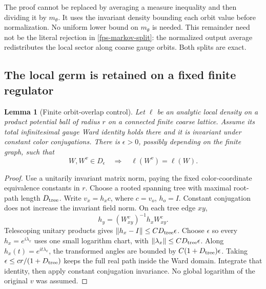 \documentclass[11pt]{article}
\newtheorem{lemma}[theorem]{Lemma}
\theoremstyle{remark}
\begin{document}
The proof cannot be replaced by averaging a measure inequality and
then dividing it by \(m_\theta\). It uses the invariant density bounding
each orbit value before normalization. No uniform lower bound on
\(m_\theta\) is needed. This remainder need not be the literal rejection
in \eqref{fps-markov-split}: the normalized output average redistributes
the local sector along coarse gauge orbits. Both splits are exact.

\subsection{The local germ is retained on a fixed finite regulator}
\label{fps-germ-section}

\begin{lemma}[Finite orbit-overlap control]
\label{fps-overlap}
Let \(\ell\) be an analytic local density on a product potential ball of
radius \(r\) on a connected finite coarse lattice. Assume its total
infinitesimal gauge Ward identity holds there and it is invariant under
constant color conjugations. There is \(\epsilon>0\), possibly depending
on the finite graph, such that
\begin{equation}
 W,W^v\in D_\epsilon\quad\Longrightarrow\quad
 \ell(W^v)=\ell(W).
 \label{fps-overlap-identity}
\end{equation}
\end{lemma}
\begin{proof}
Use a unitarily invariant matrix norm, paying the fixed color-coordinate
equivalence constants in \(r\). Choose a rooted spanning tree with
maximal root-path length \(D_{\rm tree}\). Write \(v_x=h_xc\), where
\(c=v_o\), \(h_o=I\). Constant conjugation does not increase the
invariant field norm. On each tree edge \(xy\),
\[
 h_y=(W^v_{xy})^{-1}h_xW^c_{xy}.
\]
Telescoping unitary products gives
\(\|h_x-I\|\le C D_{\rm tree}\epsilon\).
Choose \(\epsilon\) so every \(h_x=e^{i\lambda_x}\) uses one small
logarithm chart, with
\(\|\lambda_x\|\le C D_{\rm tree}\epsilon\).
Along \(h_x(t)=e^{it\lambda_x}\), the transformed angles are bounded by
\(C(1+D_{\rm tree})\epsilon\). Taking
\(\epsilon\le cr/(1+D_{\rm tree})\) keeps the full real path inside
the Ward domain. Integrate that identity, then apply constant
conjugation invariance. No global logarithm of the original \(v\)
was assumed.
\end{proof}
\end{document}
